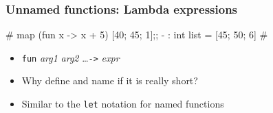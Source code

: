\documentclass{plt}
\begin{document}
\begin{frame}[fragile]
  \frametitle{Unnamed functions: Lambda expressions}

\begin{semiverbatim}
# \alert{map (fun x -> x + 5) [40; 45; 1];;}
- : int list = [45; 50; 6]
#
\end{semiverbatim}

\begin{itemize}
\item \verb|fun| \emph{arg1} \emph{arg2} \ldots \verb|->| \emph{expr}
\item Why define and name if it is really short?
\item Similar to the \verb|let| notation for named functions
\end{itemize}
\end{frame}

\fi
\end{document}
